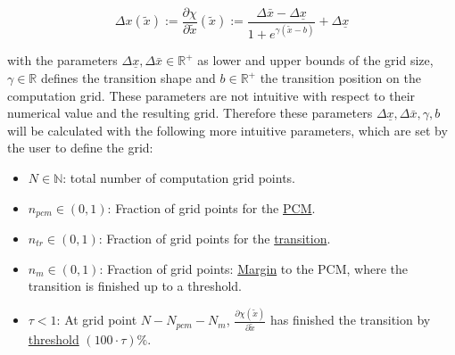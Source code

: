 \documentclass{scrartcl}[12pt, halfparskip]
\numberwithin{equation}{section}
\numberwithin{figure}{section}
\numberwithin{table}{section}
\begin{document}


\begin{equation}
	\Delta x(\tilde{x}) := \frac{\partial \chi}{\partial \tilde{x}}(\tilde{x}) := \frac{\Delta \bar{x} - \Delta \underline{x}}{1 + e^{\gamma(\tilde{x} - b)}} + \Delta \underline{x}
	\label{eq:gridsize_definition}
\end{equation}

with the parameters $\Delta \underline{x}, \Delta \bar{x} \in \mathbb{R}^+$ as lower and upper bounds of the grid size, $\gamma \in \mathbb{R}$ defines the transition shape and $b \in \mathbb{R}^+$ the transition position on the computation grid. These parameters are not intuitive with respect to their numerical value and the resulting grid. Therefore these parameters $\Delta \underline{x}, \Delta \bar{x}, \gamma, b$ will be calculated with the following more intuitive parameters, which are set by the user to define the grid:


\begin{itemize}
	\item $N \in \mathbb{N}$: total number of computation grid points.
	\item $n_{pcm} \in (0,1)$: Fraction of grid points for the \underline{PCM}.
	\item $n_{tr} \in (0,1)$: Fraction of grid points for the \underline{transition}.
	\item $n_{m} \in (0,1)$: Fraction of grid points: \underline{Margin} to the PCM, where the transition is finished up to a threshold.
	\item $\tau < 1$: At grid point $N-N_{pcm}-N_m$, $\frac{\partial \chi(\tilde{x})}{\partial \tilde{x}}$ has finished the transition by \underline{threshold} $(100 \cdot \tau)\%$.
\end{itemize}
\end{document}
